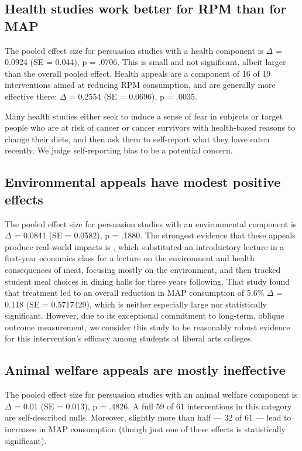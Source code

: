 \documentclass[sn-nature,pdflatex]{sn-jnl}
\begin{document}
\subsection{Health studies work better for RPM than for
MAP}\label{sec2.7}

The pooled effect size for persuasion studies with a health component is
\(\Delta\) = 0.0924 (SE = 0.044), p = .0706. This is small and not
significant, albeit larger than the overall pooled effect. Health
appeals are a component of 16 of 19 interventions aimed at reducing RPM
consumption, and are generally more effective there: \(\Delta\) = 0.2554
(SE = 0.0696), p = .0035.

Many health studies either seek to induce a sense of fear in subjects
\citep{berndsen2005} or target people who are at risk of cancer
\citep{hatami2018} or cancer survivors \citep{james2005, lee2018} with
health-based reasons to change their diets, and then ask them to
self-report what they have eaten recently. We judge self-reporting bias
to be a potential concern.

\subsection{Environmental appeals have modest positive
effects}\label{sec2.8}

The pooled effect size for persuasion studies with an environmental
component is \(\Delta\) = 0.0841 (SE = 0.0582), p = .1880. The strongest
evidence that these appeals produce real-world impacts is
\citep{jalil2023}, which substituted an introductory lecture in a
first-year economics class for a lecture on the environment and health
consequences of meat, focusing mostly on the environment, and then
tracked student meal choices in dining halls for three years following.
That study found that treatment led to an overall reduction in MAP
consumption of 5.6\% \(\Delta\) = 0.118 (SE = 0.5717429), which is
neither especially large nor statistically significant. However, due to
its exceptional commitment to long-term, oblique outcome measurement, we
consider this study to be reasonably robust evidence for this
intervention's efficacy among students at liberal arts colleges.

\subsection{Animal welfare appeals are mostly ineffective}\label{sec2.9}

The pooled effect size for persuasion studies with an animal welfare
component is \(\Delta\) = 0.01 (SE = 0.013), p = .4826. A full 59 of 61
interventions in this category are self-described nulls. Moreover,
slightly more than half --- 32 of 61 --- lead to increases in MAP
consumption (though just one of these effects is statistically
significant).
\end{document}

